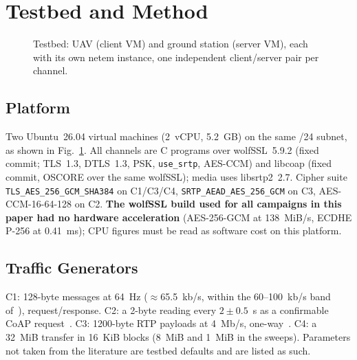 \documentclass[conference]{IEEEtran}
\begin{document}
\section{Testbed and Method}
\label{sec:method}

\begin{figure}[t]
\centering
{}
\caption{Testbed: UAV (client VM) and ground station (server VM), each with
its own netem instance, one independent client/server pair per channel.}
\label{fig:testbed}
\end{figure}

\subsection{Platform}
Two Ubuntu~26.04 virtual machines (2~vCPU, 5.2~GB) on the same /24 subnet,
as shown in Fig.~\ref{fig:testbed}.
All channels are C programs over wolfSSL~5.9.2 (fixed commit; TLS~1.3,
DTLS~1.3, PSK, \texttt{use\_srtp}, AES-CCM) and libcoap (fixed commit, OSCORE
over the same wolfSSL); media uses libsrtp2~2.7. Cipher suite
\texttt{TLS\_AES\_256\_GCM\_SHA384} on C1/C3/C4, \texttt{SRTP\_AEAD\_AES\_256\_GCM}
on C3, AES-CCM-16-64-128 on C2. \textbf{The wolfSSL build used for all
campaigns in this paper had no hardware acceleration} (AES-256-GCM at
138~MiB/s, ECDHE P-256 at 0.41~ms); CPU figures must be read as software
cost on this platform.

\subsection{Traffic Generators}
C1: 128-byte messages at 64~Hz ($\approx$65.5~kb/s, within the 60--100~kb/s
band of~\cite{zeng2019}), request/response. C2: a 2-byte reading every
$2\pm0.5$~s as a confirmable CoAP request~\cite{gundogan2020}. C3: 1200-byte
RTP payloads at 4~Mb/s, one-way~\cite{wu2018}. C4: a 32~MiB transfer in
16~KiB blocks (8~MiB and 1~MiB in the sweeps). Parameters not taken from the
literature are testbed defaults and are listed as such.
\end{document}
